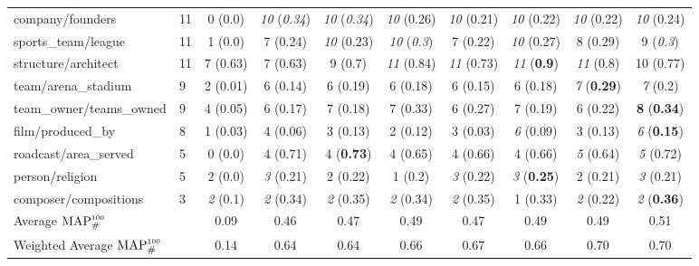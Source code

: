 \begin{center}
\begin{tabular}{ l l | c c c c c c c c }
company/founders & 11 & 0 {\small (0.0) } & {\em10} {\small ({\em0.34}) } & {\em10} {\small ({\em0.34}) } & {\em10} {\small (0.26) } & {\em10} {\small (0.21) } & {\em10} {\small (0.22) } & {\em10} {\small (0.22) } & {\em10} {\small (0.24) }\\
sports\_team/league & 11 & 1 {\small (0.0) } & 7 {\small (0.24) } & {\em10} {\small (0.23) } & {\em10} {\small ({\em0.3}) } & 7 {\small (0.22) } & {\em10} {\small (0.27) } & 8 {\small (0.29) } & 9 {\small ({\em0.3}) }\\
structure/architect & 11 & 7 {\small (0.63) } & 7 {\small (0.63) } & 9 {\small (0.7) } & {\em11} {\small (0.84) } & {\em11} {\small (0.73) } & {\em11} {\small ({\bf 0.9}) } & {\em11} {\small (0.8) } & 10 {\small (0.77) }\\
team/arena\_stadium & 9 & 2 {\small (0.01) } & 6 {\small (0.14) } & 6 {\small (0.19) } & 6 {\small (0.18) } & 6 {\small (0.15) } & 6 {\small (0.18) } & {\em7} {\small ({\bf 0.29}) } & {\em7} {\small (0.2) }\\
team\_owner/teams\_owned & 9 & 4 {\small (0.05) } & 6 {\small (0.17) } & 7 {\small (0.18) } & 7 {\small (0.33) } & 6 {\small (0.27) } & 7 {\small (0.19) } & 6 {\small (0.22) } & {\bf 8} {\small ({\bf 0.34}) }\\
film/produced\_by & 8 & 1 {\small (0.03) } & 4 {\small (0.06) } & 3 {\small (0.13) } & 2 {\small (0.12) } & 3 {\small (0.03) } & {\em6} {\small (0.09) } & 3 {\small (0.13) } & {\em6} {\small ({\bf 0.15}) }\\
roadcast/area\_served & 5 & 0 {\small (0.0) } & 4 {\small (0.71) } & 4 {\small ({\bf 0.73}) } & 4 {\small (0.65) } & 4 {\small (0.66) } & 4 {\small (0.66) } & {\em5} {\small (0.64) } & {\em5} {\small (0.72) }\\
person/religion & 5 & 2 {\small (0.0) } & {\em3} {\small (0.21) } & 2 {\small (0.22) } & 1 {\small (0.2) } & {\em3} {\small (0.22) } & {\em3} {\small ({\bf 0.25}) } & 2 {\small (0.21) } & {\em3} {\small (0.21) }\\
composer/compositions & 3 & {\em2} {\small (0.1) } & {\em2} {\small (0.34) } & {\em2} {\small (0.35) } & {\em2} {\small (0.34) } & {\em2} {\small (0.35) } & 1 {\small (0.33) } & {\em2} {\small (0.22) } & {\em2} {\small ({\bf 0.36}) }\\
\hline
  Average $\text{MAP}^{\text{\tiny{100}}}_\#$ &      &   0.09 &   0.46 &   0.47 &   0.49 &   0.47 &   0.49 &   0.49 &   0.51 \\
  Weighted Average $\text{MAP}^{\text{\tiny{100}}}_\#$ &      &   0.14 &   0.64 &   0.64 &   0.66 &   0.67 &   0.66 &   0.70 &   0.70 \\
\end{tabular}
\end{center}
